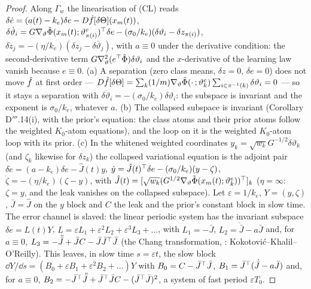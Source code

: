 \begin{proof}
Along $\Gamma_w$ the linearisation of \textup{(CL)} reads
$\delta\dot e = (a(t) - k_e)\delta e - D\hat f[\delta\Theta](x_m(t))$,
$\delta\dot\vartheta_i = G\nabla_\vartheta\tilde\Phi(x_m(t);\vartheta^e_{\pi(i)})^\top\delta e
- (\sigma_0/k_e)(\delta\vartheta_i - \delta z_{\pi(i)})$,
$\delta\dot z_j = -(\eta/k_e)(\delta z_j - \delta\bar\vartheta_j)$, with $a\equiv0$ under the derivative condition:
the second-derivative term $G\nabla^2_\vartheta(e^\top\tilde\Phi)\delta\vartheta_i$ and the $x$-derivative of the
learning law vanish because $e\equiv0$. (a) A separation (zero class means, $\delta z = 0$, $\delta e = 0$) does not
move $\hat f$ at first order ---
$D\hat f[\delta\Theta] = \sum_k(1/m)\nabla_\vartheta\tilde\Phi(\cdot\,;\vartheta^e_k)
\sum_{i\in\pi^{-1}(k)}\delta\vartheta_i = 0$ --- so it stays a separation with
$\delta\dot\vartheta_i = -(\sigma_0/k_e)\delta\vartheta_i$: the subspace is invariant and the exponent is
$\sigma_0/k_e$, whatever $a$. (b) The collapsed subspace is invariant (Corollary D$'''$.14(i), with the prior's
equation: the class atoms and their prior atoms follow the weighted $K_0$-atom equations), and the loop on it is the
weighted $K_0$-atom loop with its prior. (c) In the whitened weighted coordinates
$y_k = \sqrt{w_k}G^{-1/2}\delta\vartheta_k$ (and $\zeta_k$ likewise for $\delta z_k$) the collapsed variational
equation is the adjoint pair $\delta\dot e = (a - k_e)\delta e - \hat J(t)y$,
$\dot y = \hat J(t)^\top\delta e - (\sigma_0/k_e)(y - \zeta)$, $\dot\zeta = -(\eta/k_e)(\zeta - y)$, with
$\hat J(t) = [\sqrt{w_k}(G^{1/2}\nabla_\vartheta\tilde\Phi(x_m(t);\vartheta^e_k))^\top]_k$ ($\eta = \infty$:
$\zeta = y$, and the leak vanishes on the collapsed subspace). Let $\varepsilon = 1/k_e$, $Y = (y,\zeta)$,
$\bar J = \hat J$ on the $y$ block and $C$ the leak and the prior's constant block in slow time. The error channel is
slaved: the linear periodic system has the invariant subspace $\delta e = L(t)Y$,
$L = \varepsilon L_1 + \varepsilon^2L_2 + \varepsilon^3L_3 + \dots$, with $L_1 = -\bar J$,
$L_2 = \dot{\bar J} - a\bar J$ and, for $a\equiv0$, $L_3 = -\ddot{\bar J} + \bar JC - \bar J\bar J^\top\bar J$ (the
Chang transformation, \cite{kko1986}: Kokotovi\'c--Khalil--O'Reilly). This leaves, in slow time $s = \varepsilon t$,
the slow block $\dd Y/\dd s = (B_0 + \varepsilon B_1 + \varepsilon^2B_2 + \dots)Y$ with $B_0 = C - \bar J^\top\bar J$,
$B_1 = \bar J^\top(\dot{\bar J} - a\bar J)$ and, for $a\equiv0$,
$B_2 = -\bar J^\top\ddot{\bar J} + \bar J^\top\bar JC - (\bar J^\top\bar J)^2$, a system of fast period $\varepsilon T_0$.

\end{proof}
